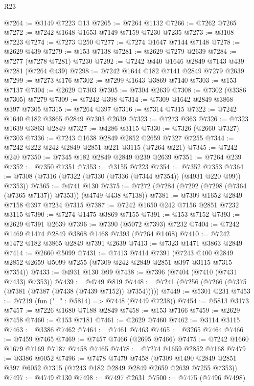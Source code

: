 \begin{lexlean}{R23}
\begin{coremodule}
@7264 := @3149 @7223 @13
@7265 := @7264 @1132
@7266 := @7262 @7265
@7272 := @7242 @1648 @1653 @7149 @7159 @7230 @7235
@7273 := @3108 @7223
@7274 := @7273 @250
@7277 := @7274 @1647 @7144 @7148
@7278 := @2629 @439
@7279 := @153 @7138
@7281 := @2629 @7279 @2639
@7284 := @7277 (@7278 @7281) @7230
@7292 := @7242 @440 @1646 @2849 @7143 @439 @7281 (@7264 @439)
@7298 := @7242 @1644 @182 @7141 @2849 @7279 @2639
@7299 := @7273 @176
@7302 := @7299 @1643 @3869 @7140
@7303 := @153 @7137
@7304 := @2629 @7303
@7305 := @7304 @2639
@7308 := @7302 (@3386 @7305) @7279
@7309 := @7242 @398
@7314 := @7309 @1642 @2849 @3868 @397 @7305
@7315 := @7264 @397
@7316 := @7314 @7315
@7322 := @7242 @1640 @182 @3865 @2849 @7303 @2639
@7323 := @7273 @363
@7326 := @7323 @1639 @3863 @2849
@7327 := @4286 @3115
@7330 := @7326 (@2660 @7327) @7303
@7336 := @7243 @1638 @2849 @2852 @2659 @7327 @7255
@7344 := @7242 @222 @242 @2849 @2851 @221 @3115 (@7264 @221)
@7345 := @7242 @240
@7350 := @7345 @182 @2849 @2849 @239 @2639
@7351 := @7264 @239
@7352 := @7350 @7351
@7353 := @3155 @7223
@7354 := @7352 @7353
@7364 := @7308 (@7316 (@7322 (@7330 (@7336 (@7344 @7354)) (@4931 @220 @99)) @7353))
@7365 := @4741 @130
@7375 := @7272 (@7284 (@7292 (@7298 (@7364 (@7365 @7137)) @7353)) (@4749 @438 @7138))
@7381 := @7309 @1652 @2849 @7158 @397 @7234 @7315
@7387 := @7242 @1650 @242 @7156 @2851 @7232 @3115
@7390 := @7274 @1475 @3869 @7155
@7391 := @153 @7152
@7393 := @2629 @7391 @2639
@7396 := @7390 (@5072 @7393) @7232
@7404 := @7242 @1469 @1474 @2849 @3868 @1468 @7393 (@7264 @1468)
@7410 := @7242 @1472 @182 @3865 @2849 @7391 @2639
@7413 := @7323 @1471 @3863 @2849
@7414 := @2660 @5099
@7431 := @7413
    @7414
    @7391
    (@7243 @400 @2849 @2852 @2659 @5099 @7255 (@7309 @242 @2849 @2851 @397 @3115 @7315 @7354))
@7433 := @4931 @130 @99
@7438 := @7396 (@7404 (@7410 (@7431 @7433) @7353))
@7439 := @4749 @819
@7448 := @7241 (@7256 (@7266 (@7375 (@7381 (@7387 (@7438 (@7439 @7152)) @7354)))))
@7449 := @5301 @231
@7453 := @7219 (fun ("_" : @5814) => @7448 (@7449 @7238))
@7454 := @5813 @3173
@7457 := @7226 @1680 @7188 @2849
@7458 := @153 @7166
@7459 := @2629 @7458
@7460 := @153 @7181
@7461 := @2629 @7460
@7462 := @3114 @3115
@7463 := @3386 @7462
@7464 := @7461 @7463
@7465 := @3265 @7464
@7466 := @7459 @7465
@7469 := @7457 @7466 (@2695 @7466)
@7475 := @7242 @1660 @1679 @7169 @7187 @7458 @7465
@7478 := @7274 @1659 @2852 @7168
@7479 := @3386 @6052
@7496 := @7478
    @7479
    @7458
    (@7309 @1490 @2849 @2851 @397 @6052 @7315 (@7243 @182 @2849 @2849 @2659 @2639 @7255 @7353))
@7497 := @4749 @130
@7498 := @7497 @2631
@7500 := @7475 (@7496 @7498)

\end{coremodule}
\end{lexlean}
